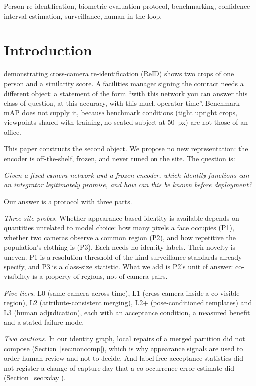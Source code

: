 \documentclass[journal]{IEEEtran}
\begin{document}
\begin{IEEEkeywords}
Person re-identification, biometric evaluation protocol, benchmarking, confidence interval estimation, surveillance, human-in-the-loop.
\end{IEEEkeywords}

\section{Introduction}
 demonstrating cross-camera re-identification (ReID) shows two crops of one person and a similarity score. A facilities manager signing the contract needs a different object: a statement of the form ``with this network you can answer this class of question, at this accuracy, with this much operator time''. Benchmark mAP does not supply it, because benchmark conditions (tight upright crops, viewpoints shared with training, no seated subject at 50~px) are not those of an office.

This paper constructs the second object. We propose no new representation: the encoder is off-the-shelf, frozen, and never tuned on the site. The question is:

\emph{Given a fixed camera network and a frozen encoder, which identity functions can an integrator legitimately promise, and how can this be known before deployment?}

Our answer is a protocol with three parts.

\emph{Three site probes.} Whether appearance-based identity is available depends on quantities unrelated to model choice: how many pixels a face occupies (P1), whether two cameras observe a common region (P2), and how repetitive the population's clothing is (P3). Each needs no identity labels. Their novelty is uneven. P1 is a resolution threshold of the kind surveillance standards already specify, and P3 is a class-size statistic. What we add is P2's unit of answer: co-visibility is a property of regions, not of camera pairs.

\emph{Five tiers.} L0 (same camera across time), L1 (cross-camera inside a co-visible region), L2 (attribute-consistent merging), L2+ (pose-conditioned templates) and L3 (human adjudication), each with an acceptance condition, a measured benefit and a stated failure mode.

\emph{Two cautions.} In our identity graph, local repairs of a merged partition did not compose (Section~\ref{sec:noncomp}), which is why appearance signals are used to order human review and not to decide. And label-free acceptance statistics did not register a change of capture day that a co-occurrence error estimate did (Section~\ref{sec:xday}).
\end{document}
